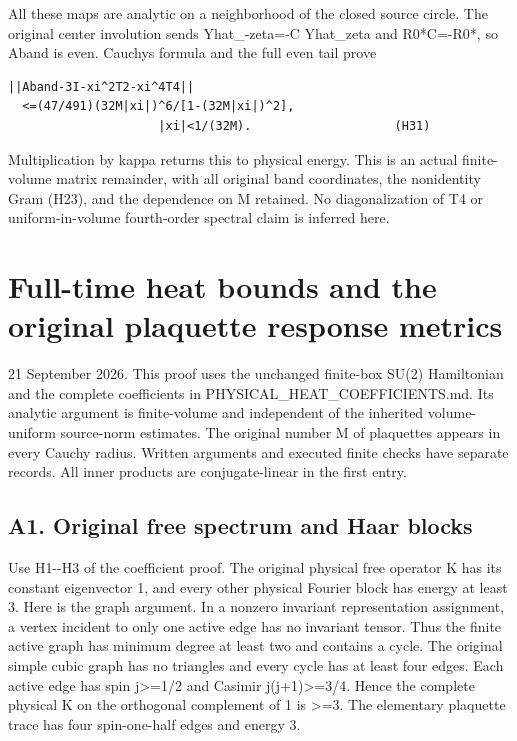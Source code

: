 \documentclass[11pt,a4paper]{article}
\let\originalsection\section
\renewcommand{\section}{\clearpage\originalsection}
\renewcommand{\[}{\begingroup\small\originaldisplaystart}
\renewcommand{\]}{\originaldisplayend\endgroup}
\begin{document}
All these maps are analytic on a neighborhood of the closed source
circle. The original center involution sends Yhat\_-zeta=-C Yhat\_zeta
and R0*C=-R0*, so Aband is even. Cauchy\textquotesingle s formula and
the full even tail prove

\begin{verbatim}
||Aband-3I-xi^2T2-xi^4T4||
  <=(47/491)(32M|xi|)^6/[1-(32M|xi|)^2],
                     |xi|<1/(32M).                    (H31)
\end{verbatim}

Multiplication by kappa returns this to physical energy. This is an
actual finite-volume matrix remainder, with all original band
coordinates, the nonidentity Gram (H23), and the dependence on M
retained. No diagonalization of T4 or uniform-in-volume fourth-order
spectral claim is inferred here.

\section{Full-time heat bounds and the original plaquette response
metrics}\label{full-time-heat-bounds-and-the-original-plaquette-response-metrics}

21 September 2026. This proof uses the unchanged finite-box SU(2)
Hamiltonian and the complete coefficients in
{P\allowbreak{}H\allowbreak{}Y\allowbreak{}S\allowbreak{}I\allowbreak{}C\allowbreak{}A\allowbreak{}L\allowbreak{}\_\allowbreak{}H\allowbreak{}E\allowbreak{}A\allowbreak{}T\allowbreak{}\_\allowbreak{}C\allowbreak{}O\allowbreak{}E\allowbreak{}F\allowbreak{}F\allowbreak{}I\allowbreak{}C\allowbreak{}I\allowbreak{}E\allowbreak{}N\allowbreak{}T\allowbreak{}S\allowbreak{}.\allowbreak{}m\allowbreak{}d\allowbreak{}.\allowbreak{}}
Its analytic argument is finite-volume and independent of the inherited
volume-uniform source-norm estimates. The original number M of
plaquettes appears in every Cauchy radius. Written arguments and
executed finite checks have separate records. All inner products are
conjugate-linear in the first entry.

\subsection{A1. Original free spectrum and Haar
blocks}\label{a1.-original-free-spectrum-and-haar-blocks}

Use H1-\/-H3 of the coefficient proof. The original physical free
operator K has its constant eigenvector 1, and every other physical
Fourier block has energy at least 3. Here is the graph argument. In a
nonzero invariant representation assignment, a vertex incident to only
one active edge has no invariant tensor. Thus the finite active graph
has minimum degree at least two and contains a cycle. The original
simple cubic graph has no triangles and every cycle has at least four
edges. Each active edge has spin j\textgreater=1/2 and Casimir
j(j+1)\textgreater=3/4. Hence the complete physical K on the orthogonal
complement of 1 is \textgreater=3. The elementary plaquette trace has
four spin-one-half edges and energy 3.
\end{document}
